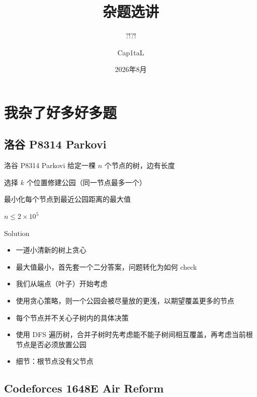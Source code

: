 ﻿\documentclass[aspectratio=169]{ctexbeamer}
\author{Cap1taL}
\title{杂题选讲}
\subtitle{?!?!}
\date{2026年8月}
\begin{document}
\kaishu

\begin{frame}
    \titlepage
\end{frame}



\section{我杂了好多好多题}

\subsection{洛谷 P8314 Parkovi}
\begin{frame}{洛谷 P8314 Parkovi}
    给定一棵 $n$ 个节点的树，边有长度

选择 $k$ 个位置修建公园（同一节点最多一个）

最小化每个节点到最近公园距离的最大值

$n\leq 2\times 10^5$
\end{frame}

\begin{frame}{Solution}
    \begin{itemize}
        \item 一道小清新的树上贪心
        \item 最大值最小，首先套一个二分答案，问题转化为如何 check
        \item 我们从端点（叶子）开始考虑
        \item 使用贪心策略，则一个公园会被尽量放的更浅，以期望覆盖更多的节点
        \item 每个节点并不关心子树内的具体决策
        \item 使用 DFS 遍历树，合并子树时先考虑能不能子树间相互覆盖，再考虑当前根节点是否必须放置公园
        \item 细节：根节点没有父节点 
    \end{itemize}
\end{frame}

\subsection{Codeforces 1648E Air Reform}
\end{document}

